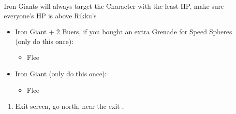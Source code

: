 \begin{encounters}
    Iron Giants will always target the Character with the least HP, make sure everyone's HP is above Rikku's
    \begin{itemize}
        \item Iron Giant + 2 Buers, if you bought an extra Grenade for Speed Spheres (only do this once):
        \begin{itemize}
            \switch{\tidus}{\rikku}
            \rikkuf Use Grenade
            \wakkaf Defend
            \auronf Defend
            \enemyf Attacks \rikku
            \switch{\wakka}{\tidus}
            \item Flee
        \end{itemize}
        \item Iron Giant (only do this once):
        \begin{itemize}
            \tidusf Defend
            \switch{\wakka}{\rikku}
            \rikkuf Steal Light Curtain
            \auronf Defend
            \enemyf Attacks \rikku
            \item Flee
        \end{itemize}
    \end{itemize}
\end{encounters}
\begin{enumerate}[resume]
    \item Exit screen, go north, near the exit \sd, \cs[3:10]
\end{enumerate}